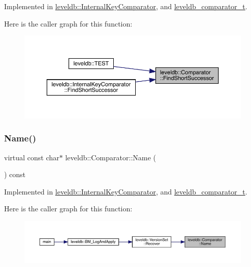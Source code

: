 Implemented in \mbox{\hyperlink{classleveldb_1_1_internal_key_comparator_a221a28a524474834b2cba5c3be84cb13}{leveldb\+::\+Internal\+Key\+Comparator}}, and \mbox{\hyperlink{structleveldb__comparator__t_a46671a92506b28d1df61125499df3d23}{leveldb\+\_\+comparator\+\_\+t}}.

Here is the caller graph for this function\+:
\nopagebreak
\begin{figure}[H]
\begin{center}
\leavevmode
\includegraphics[width=350pt]{structleveldb_1_1_comparator_a49751dd906595633161dfad943d24b3b_icgraph}
\end{center}
\end{figure}
\mbox{\label{structleveldb_1_1_comparator_a888b039bdd6d59517dca75fb40721f5e}} 
\subsubsection{\texorpdfstring{Name()}{Name()}}
{\footnotesize\ttfamily virtual const char$\ast$ leveldb\+::\+Comparator\+::\+Name (\begin{DoxyParamCaption}{ }\end{DoxyParamCaption}) const\hspace{0.3cm}{\ttfamily [pure virtual]}}



Implemented in \mbox{\hyperlink{classleveldb_1_1_internal_key_comparator_ae8848b098c0c20071aa93a166b80de0d}{leveldb\+::\+Internal\+Key\+Comparator}}, and \mbox{\hyperlink{structleveldb__comparator__t_aaf7e79d77687d0542037ae5310296180}{leveldb\+\_\+comparator\+\_\+t}}.

Here is the caller graph for this function\+:
\nopagebreak
\begin{figure}[H]
\begin{center}
\leavevmode
\includegraphics[width=350pt]{structleveldb_1_1_comparator_a888b039bdd6d59517dca75fb40721f5e_icgraph}
\end{center}
\end{figure}
\mbox{\label{structleveldb_1_1_comparator_af56f4d3b86bd598dde1d1af379ea486d}} 
